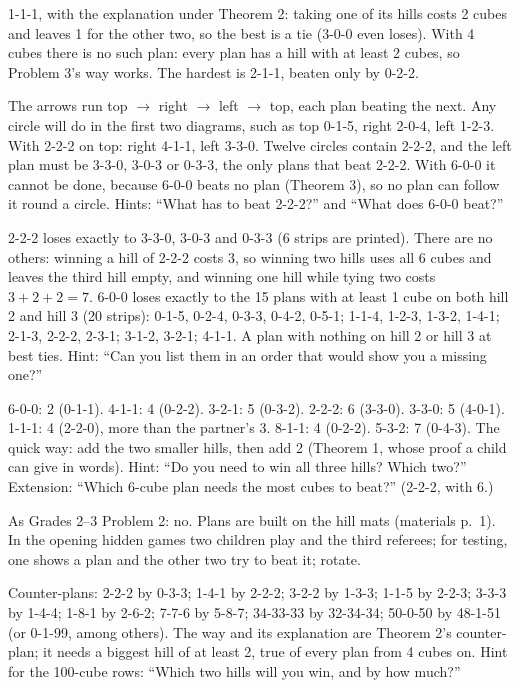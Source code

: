 1-1-1, with the explanation under Theorem 2: taking one of its hills costs 2 cubes and leaves 1 for the other two, so the best is a tie (3-0-0 even loses). With 4 cubes there is no such plan: every plan has a hill with at least 2 cubes, so Problem 3's way works. The hardest is 2-1-1, beaten only by 0-2-2.

The arrows run top $\to$ right $\to$ left $\to$ top, each plan beating the next. Any circle will do in the first two diagrams, such as top 0-1-5, right 2-0-4, left 1-2-3. With 2-2-2 on top: right 4-1-1, left 3-3-0. Twelve circles contain 2-2-2, and the left plan must be 3-3-0, 3-0-3 or 0-3-3, the only plans that beat 2-2-2. With 6-0-0 it cannot be done, because 6-0-0 beats no plan (Theorem 3), so no plan can follow it round a circle. Hints: ``What has to beat 2-2-2?'' and ``What does 6-0-0 beat?''

2-2-2 loses exactly to 3-3-0, 3-0-3 and 0-3-3 (6 strips are printed). There are no others: winning a hill of 2-2-2 costs 3, so winning two hills uses all 6 cubes and leaves the third hill empty, and winning one hill while tying two costs $3+2+2=7$. 6-0-0 loses exactly to the 15 plans with at least 1 cube on both hill 2 and hill 3 (20 strips): 0-1-5, 0-2-4, 0-3-3, 0-4-2, 0-5-1; 1-1-4, 1-2-3, 1-3-2, 1-4-1; 2-1-3, 2-2-2, 2-3-1; 3-1-2, 3-2-1; 4-1-1. A plan with nothing on hill 2 or hill 3 at best ties. Hint: ``Can you list them in an order that would show you a missing one?''

6-0-0: 2 (0-1-1). 4-1-1: 4 (0-2-2). 3-2-1: 5 (0-3-2). 2-2-2: 6 (3-3-0). 3-3-0: 5 (4-0-1). 1-1-1: 4 (2-2-0), more than the partner's 3. 8-1-1: 4 (0-2-2). 5-3-2: 7 (0-4-3). The quick way: add the two smaller hills, then add 2 (Theorem 1, whose proof a child can give in words). Hint: ``Do you need to win all three hills? Which two?'' Extension: ``Which 6-cube plan needs the most cubes to beat?'' (2-2-2, with 6.)

As Grades 2--3 Problem 2: no. Plans are built on the hill mats (materials p.~1). In the opening hidden games two children play and the third referees; for testing, one shows a plan and the other two try to beat it; rotate.

Counter-plans: 2-2-2 by 0-3-3; 1-4-1 by 2-2-2; 3-2-2 by 1-3-3; 1-1-5 by 2-2-3; 3-3-3 by 1-4-4; 1-8-1 by 2-6-2; 7-7-6 by 5-8-7; 34-33-33 by 32-34-34; 50-0-50 by 48-1-51 (or 0-1-99, among others). The way and its explanation are Theorem 2's counter-plan; it needs a biggest hill of at least 2, true of every plan from 4 cubes on. Hint for the 100-cube rows: ``Which two hills will you win, and by how much?''

